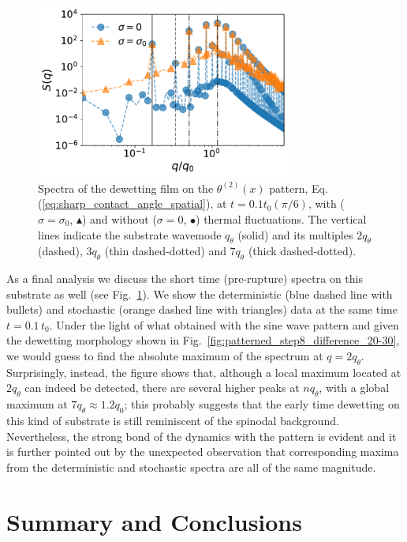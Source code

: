  \begin{figure}
     \centering
     \includegraphics[width=0.75\textwidth]{graphics/square_wave_det_stoch.pdf}
     \caption{Spectra of the dewetting film on the $\theta^{(2)}(x)$ pattern, Eq.(\ref{eq:sharp_contact_angle_spatial}), at $t = 0.1t_0(\pi/6)$, with ($\sigma = \sigma_0$, \textcolor{pyorange}{$\blacktriangle$}) and without ($\sigma =0$, \textcolor{pyblue}{$\bullet$}) thermal fluctuations. 
     The vertical lines indicate the substrate wavemode $q_{\theta}$ (solid) and its multiples $2q_{\theta}$ (dashed), $3q_{\theta}$ (thin dashed-dotted) and $7q_{\theta}$ (thick dashed-dotted).}
     \label{fig:square_wave_both}
 \end{figure}
As a final analysis we discuss the short time (pre-rupture) spectra on this substrate as well (see Fig.~\ref{fig:square_wave_both}).
We show the deterministic (blue dashed line with bullets) and stochastic (orange dashed line with triangles) data at the same time $t=0.1\,t_0$.
Under the light of what obtained with the sine wave pattern and given the dewetting morphology shown in Fig.~\ref{fig:patterned_step8_difference_20-30}, we would guess to find the absolute maximum of the spectrum at $q=2 q_{\theta}$.
Surprisingly, instead, the figure shows that, although a local maximum located at $2q_{\theta}$ can 
indeed be detected, there are several higher peaks at $n q_{\theta}$, with a global maximum at $7q_{\theta} \approx 1.2 q_0$; this probably suggests that the early time dewetting on this kind of substrate is still reminiscent of the spinodal background. Nevertheless, the strong bond of the dynamics with the
 pattern is evident and it is further pointed out by the unexpected observation that corresponding maxima
 from the deterministic and stochastic spectra are all of the same magnitude.

\section{Summary and Conclusions}\label{sec:sum_conclu}

